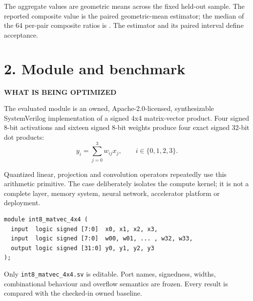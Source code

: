 \documentclass[10pt,a4paper]{article}
\newcommand{\smallcaps}[1]{\textcolor{Mid}{\fontsize{8.5}{10}\selectfont\bfseries\MakeUppercase{#1}}}
\newcommand{\newpageheading}[2]{\clearpage\section{#1}\smallcaps{#2}\vspace{6pt}}
\begin{document}
The aggregate values are geometric means across the fixed held-out sample. The reported composite value \OptimizedScore{} is the paired geometric-mean estimator; the median of the 64 per-pair composite ratios is \CompositeMedian. The estimator and its paired interval define acceptance.

\newpageheading{2. Module and benchmark}{What is being optimized}

The evaluated module is an owned, Apache-2.0-licensed, synthesizable SystemVerilog implementation of a signed 4x4 matrix-vector product. Four signed 8-bit activations and sixteen signed 8-bit weights produce four exact signed 32-bit dot products:
\[
y_i=\sum_{j=0}^{3} w_{ij}x_j,\qquad i\in\{0,1,2,3\}.
\]

Quantized linear, projection and convolution operators repeatedly use this arithmetic primitive. The case deliberately isolates the compute kernel; it is not a complete layer, memory system, neural network, accelerator platform or deployment.

\begin{lstlisting}[language=SystemVerilogDiff]
module int8_matvec_4x4 (
  input  logic signed [7:0]  x0, x1, x2, x3,
  input  logic signed [7:0]  w00, w01, ... , w32, w33,
  output logic signed [31:0] y0, y1, y2, y3
);
\end{lstlisting}

\begin{center}
\end{center}

Only \texttt{int8\_matvec\_4x4.sv} is editable. Port names, signedness, widths, combinational behaviour and overflow semantics are frozen. Every result is compared with the checked-in owned baseline.
\end{document}
